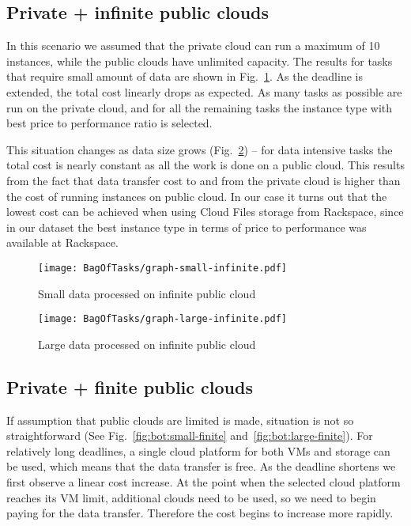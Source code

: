 {\subsection{Private + infinite public clouds}
\label{sec:bot:private-infinite} 
  In this scenario we assumed that the private cloud can run a maximum of 10 instances, while the public clouds have unlimited capacity. The results for tasks that require small amount of data are shown in Fig.~\ref{fig:bot:small-infinite}. As the deadline is extended, the total cost linearly drops as expected. As many tasks as possible are run on the private cloud, and for all the remaining tasks the instance type with best price to performance ratio is selected.
    
  This situation changes as data size grows (Fig.~\ref{fig:bot:large-infinite}) -- for data intensive tasks the total cost is nearly constant as all the work is done on a public cloud. This results from the fact that data transfer cost to and from the private cloud is higher than the cost of running instances on public cloud. In our case it turns out that the lowest cost can be achieved when using Cloud Files storage from Rackspace, since in our dataset the best instance type in terms of price to performance was available at Rackspace. 
        
  \begin{figure}[tb] 
     \centering
     \texttt{[image: BagOfTasks/graph-small-infinite.pdf]}
     \caption{Small data processed on infinite public cloud\label{fig:bot:small-infinite}}
     
  \end{figure}

  \begin{figure}[tb] 
     \centering
     \texttt{[image: BagOfTasks/graph-large-infinite.pdf]}
     \caption{Large data processed on infinite public cloud\label{fig:bot:large-infinite}}
  \end{figure}        
    
\subsection{Private + finite public clouds}
\label{sec:bot:private-finite}
    
  If assumption that public clouds are limited is made, situation is not so straightforward (See Fig.~\ref{fig:bot:small-finite} and~\ref{fig:bot:large-finite}). For relatively long deadlines, a single cloud platform for both VMs and storage can be used, which means that the data transfer is free. As the deadline shortens we first observe a linear cost increase. At the point when the selected cloud platform reaches its VM limit, additional clouds need to be used, so we need to begin paying for the data transfer. Therefore the cost begins to increase more rapidly.
  
}
